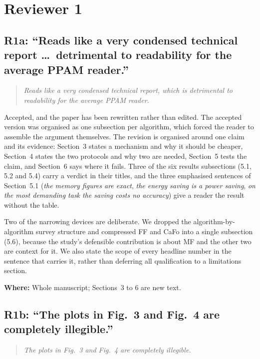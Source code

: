 \documentclass[11pt,a4paper]{article}
\newcommand{\FF}{FF}
\newcommand{\MF}{MF}
\newcommand{\CaFo}{CaFo}
\newenvironment{comment}%
  {\begin{quote}\itshape\small}%
  {\end{quote}}
\newcommand{\where}[1]{\par\smallskip\noindent\textbf{Where:} #1\par}
\begin{document}
\section*{Reviewer 1}

\subsection*{R1a: ``Reads like a very condensed technical report \dots\
detrimental to readability for the average PPAM reader.''}

\begin{comment}
Reads like a very condensed technical report, which is detrimental to
readability for the average PPAM reader.
\end{comment}

\noindent
Accepted, and the paper has been rewritten rather than edited. The accepted
version was organised as one subsection per algorithm, which forced the reader
to assemble the argument themselves. The revision is organised around one
claim and its evidence: Section~3 states a mechanism and why it should be
cheaper, Section~4 states the two protocols and why two are needed, Section~5
tests the claim, and Section~6 says where it fails. Three of the six results subsections (5.1, 5.2 and 5.4) carry a verdict in their titles, and the three emphasised sentences of
Section~5.1 (\emph{the memory figures are exact}, \emph{the energy saving is a
power saving}, \emph{on the most demanding task the saving costs no
accuracy}) give a reader
the result without the table.

Two of the narrowing devices are deliberate. We dropped the
algorithm-by-algorithm survey structure and compressed \FF{} and \CaFo{} into
a single subsection (5.6), because the study's defensible contribution is
about \MF{} and the other two are context for it. We also state the scope of
every headline number in the sentence that carries it, rather than deferring
all qualification to a limitations section.

\where{Whole manuscript; Sections~3 to 6 are new text.}

\subsection*{R1b: ``The plots in Fig.~3 and Fig.~4 are completely illegible.''}

\begin{comment}
The plots in Fig.~3 and Fig.~4 are completely illegible.
\end{comment}
\end{document}
